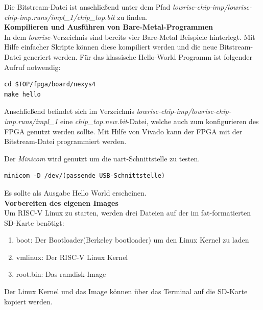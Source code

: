 Die Bitstream-Datei ist anschließend unter dem Pfad \emph{lowrisc-chip-imp/lowrisc-chip-imp.runs/impl\_1/chip\_top.bit} zu finden.\\

\textbf{Kompilieren und Ausführen von Bare-Metal-Programmen}\\

In dem \emph{lowrisc}-Verzeichnis sind bereits vier Bare-Metal Beispiele hinterlegt. Mit Hilfe einfacher Skripte können diese kompiliert werden und die neue Bitstream-Datei generiert werden.
Für das klassische Hello-World Programm ist folgender Aufruf notwendig:\\

\begin{lstlisting}[caption={Erzeugen und kompilieren eines Beispielprogrammes},label={code:helloworld}]
cd $TOP/fpga/board/nexys4
make hello
\end{lstlisting}


Anschließend befindet sich im Verzeichnis \emph{lowrisc-chip-imp/lowrisc-chip-imp.runs/impl\_1} eine \emph{chip\_top.new.bit}-Datei, welche auch zum konfigurieren des FPGA genutzt werden sollte.
Mit Hilfe von Vivado kann der FPGA mit der Bitstream-Datei programmiert werden.

Der \emph{Minicom} wird genutzt um die \ac{uart}-Schnittstelle zu testen.\\

\begin{lstlisting}[caption={Aufruf des \emph{Minicom}},label={code:minicom}]
minicom -D /dev/(passende USB-Schnittstelle)
\end{lstlisting}


Es sollte als Ausgabe Hello World erscheinen.\\

\textbf{Vorbereiten des eigenen Images}\\

Um RISC-V Linux zu starten, werden drei Dateien auf der im \ac{fat}-formatierten SD-Karte benötigt:
\begin{enumerate}
  \item boot: Der Bootloader(Berkeley bootloader) um den Linux Kernel zu laden
  \item vmlinux: Der RISC-V Linux Kernel
  \item root.bin: Das ramdisk-Image
\end{enumerate}

\vspace{5mm}
Der Linux Kernel und das Image können über das Terminal auf die SD-Karte kopiert werden.

